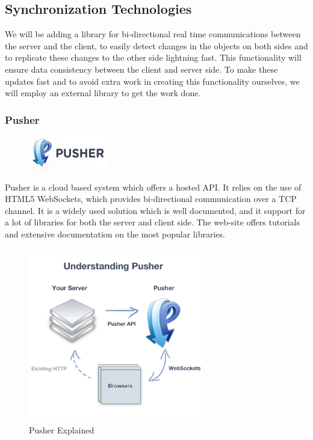 \subsection{Synchronization Technologies}
We will be adding a library for bi-directional real time communications between the server and the client, to easily detect changes in the objects on both sides and to replicate these changes to the other side lightning fast. This functionality will ensure data consistency between the client and server side. To make these updates fast and to avoid extra work in creating this functionality ourselves, we will employ an external library to get the work done.

\subsubsection{Pusher}

\begin{figure}
\centering
\includegraphics[width=.19\textwidth]{image/pusher-logo.jpg}
\end{figure}

Pusher is a cloud based system which offers a hosted API. It relies on the use of HTML5 WebSockets, which provides bi-directional communication over a TCP channel. It is a widely used solution which is well documented, and it support for a lot of libraries for both the server and client side. The web-site offers tutorials and extensive documentation on the most popular libraries. 

\begin{figure}
\centering
\includegraphics[width=3in]{image/pusher-explained.png}
\caption{Pusher Explained}
\end{figure}


